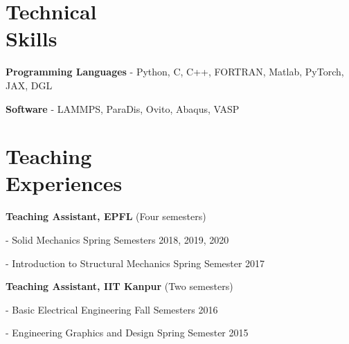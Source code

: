\documentclass[margin,line]{resume}
\begin{document}
\begin{resume}
    \section{\mysidestyle Technical \\Skills}
    \textbf{\textsf{Programming Languages}} - Python, C, C++,  FORTRAN, Matlab, PyTorch, JAX, DGL

    \textbf{\textsf{Software}} -  LAMMPS, ParaDis, Ovito, Abaqus, VASP

    \section{\mysidestyle Teaching \\Experiences}

    \textbf{\textsf{Teaching Assistant, EPFL}} \textsf{(Four semesters)}
    \vspace{-0.3cm}\begin{compactitem}
        \item[-] Solid Mechanics \hfill \small{Spring  Semesters 2018, 2019, 2020}
        \item[-] Introduction to Structural Mechanics  \hfill \small{Spring  Semester 2017}
    \end{compactitem}

    \textbf{\textsf{Teaching Assistant, IIT Kanpur}} \textsf{(Two semesters)}
    \vspace{-0.3cm}\begin{compactitem}
        \item[-] Basic Electrical Engineering \hfill \small{Fall  Semesters 2016}
        \item[-] Engineering Graphics and Design  \hfill \small{Spring  Semester 2015}
    \end{compactitem}






\end{resume}
\end{document}
